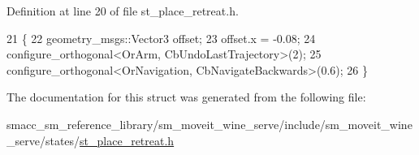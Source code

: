 Definition at line 20 of file st\+\_\+place\+\_\+retreat.\+h.


\begin{DoxyCode}
21         \{
22             geometry\_msgs::Vector3 offset;
23             offset.x = -0.08;
24             configure\_orthogonal<OrArm, CbUndoLastTrajectory>(2);
25             configure\_orthogonal<OrNavigation, CbNavigateBackwards>(0.6);
26         \}
\end{DoxyCode}


The documentation for this struct was generated from the following file\+:\begin{DoxyCompactItemize}
\item 
smacc\+\_\+sm\+\_\+reference\+\_\+library/sm\+\_\+moveit\+\_\+wine\+\_\+serve/include/sm\+\_\+moveit\+\_\+wine\+\_\+serve/states/\hyperlink{sm__moveit__wine__serve_2include_2sm__moveit__wine__serve_2states_2st__place__retreat_8h}{st\+\_\+place\+\_\+retreat.\+h}\end{DoxyCompactItemize}
